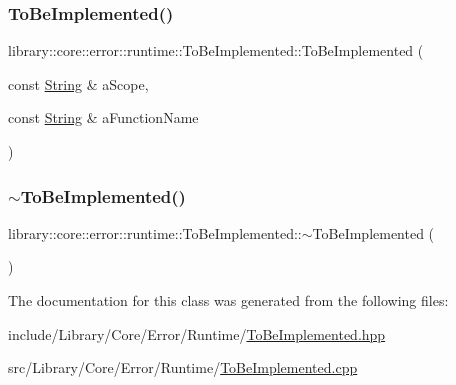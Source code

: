 \mbox{\label{classlibrary_1_1core_1_1error_1_1runtime_1_1_to_be_implemented_a97439e9669fa5c1926de93fc0446f583}} 
\subsubsection{\texorpdfstring{To\+Be\+Implemented()}{ToBeImplemented()}\hspace{0.1cm}{\footnotesize\ttfamily [3/3]}}
{\footnotesize\ttfamily library\+::core\+::error\+::runtime\+::\+To\+Be\+Implemented\+::\+To\+Be\+Implemented (\begin{DoxyParamCaption}\item[{const \hyperlink{classlibrary_1_1core_1_1types_1_1_string}{String} \&}]{a\+Scope,  }\item[{const \hyperlink{classlibrary_1_1core_1_1types_1_1_string}{String} \&}]{a\+Function\+Name }\end{DoxyParamCaption})}

\mbox{\label{classlibrary_1_1core_1_1error_1_1runtime_1_1_to_be_implemented_a4d6d8204b46f1f5eb41458849a891787}} 
\subsubsection{\texorpdfstring{$\sim$\+To\+Be\+Implemented()}{~ToBeImplemented()}}
{\footnotesize\ttfamily library\+::core\+::error\+::runtime\+::\+To\+Be\+Implemented\+::$\sim$\+To\+Be\+Implemented (\begin{DoxyParamCaption}{ }\end{DoxyParamCaption})}



The documentation for this class was generated from the following files\+:\begin{DoxyCompactItemize}
\item 
include/\+Library/\+Core/\+Error/\+Runtime/\hyperlink{_to_be_implemented_8hpp}{To\+Be\+Implemented.\+hpp}\item 
src/\+Library/\+Core/\+Error/\+Runtime/\hyperlink{_to_be_implemented_8cpp}{To\+Be\+Implemented.\+cpp}\end{DoxyCompactItemize}
